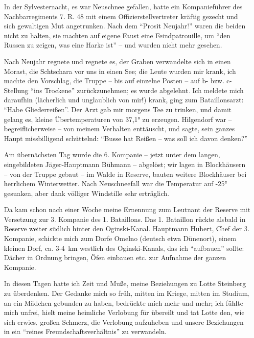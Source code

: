 In der Sylvesternacht, es war Neuschnee gefallen, hatte ein Kompanieführer des Nachbarregiments 7. R. 48 mit einem Offizierstellvertreter kräftig gezecht und sich gewaltigen Mut angetrunken. Nach dem \enquote{Prosit Neujahr!} waren die beiden nicht zu halten, sie machten auf eigene Faust eine Feindpatrouille, um \enquote{den Russen zu zeigen, was eine Harke ist} -- und wurden nicht mehr gesehen.

Nach Neujahr regnete und regnete es, der Graben verwandelte sich in einen Morast, die {Schtschara} vor uns in einen See; die Leute wurden mir krank, ich machte den Vorschlag, die Truppe -- bis auf einzelne Posten -- auf b- bzw. c-Stellung \enquote{ins Trockene} zurückzunehmen; es wurde abgelehnt. Ich meldete mich daraufhin (lächerlich und unglaublich von mir!) krank, ging zum Bataillonsarzt: \enquote{Habe Gliederreißen}. Der Arzt gab mir morgens Tee zu trinken, und damit gelang es, kleine Übertemperaturen von 37,1° zu erzeugen. Hilgendorf war -- begreiflicherweise -- von meinem Verhalten enttäuscht, und sagte, sein ganzes Haupt missbilligend schüttelnd: \enquote{Busse hat Reißen -- was soll ich davon denken?}

Am übernächsten Tag wurde die 6. Kompanie -- jetzt unter dem langen, eingebildeten Jäger-Hauptmann Bühmann -- abgelöst; wir lagen in Blockhäusern -- von der Truppe gebaut -- im Walde in Reserve, bauten weitere Blockhäuser bei herrlichem Winterwetter. Nach Neuschneefall war die Temperatur auf -25° gesunken, aber dank völliger Windstille sehr erträglich.

Da kam schon nach einer Woche meine Ernennung zum Leutnant der Reserve mit Versetzung zur 3. Kompanie des 1. Bataillons. Das 1. Bataillon rückte alsbald in Reserve weiter südlich hinter den Oginski-Kanal. Hauptmann Hubert, Chef der 3. Kompanie, schickte mich zum Dorfe Omelno (deutsch etwa Dünenort), einem kleinen Dorf, ca. 3-4~km westlich des Oginski-Kanals, das ich \enquote{aufbauen} sollte: Dächer in Ordnung bringen, Öfen einbauen etc. zur Aufnahme der ganzen Kompanie.

In diesen Tagen hatte ich Zeit und Muße, meine Beziehungen zu Lotte Steinberg zu überdenken. Der Gedanke mich so früh, mitten im Kriege, mitten im Studium, an ein Mädchen gebunden zu haben, bedrückte mich mehr und mehr; ich fühlte mich unfrei, hielt meine heimliche Verlobung für übereilt und tat Lotte den, wie sich erwies, großen Schmerz, die Verlobung aufzuheben und unsere Beziehungen in ein \enquote{reines Freundschaftsverhältnis} zu verwandeln.

